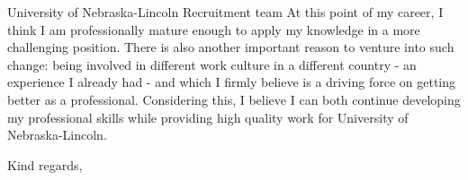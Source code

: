 \documentclass[11pt]{letter}
\begin{document}
\begin{letter}{University of Nebraska-Lincoln Recruitment team}
  At this point of my career, I think I am professionally mature enough to apply my knowledge in a more
  challenging position. There is also another important reason to venture into such change: being involved in different
  work culture in a different country - an experience I already had - and which I firmly believe is a driving force
  on getting better as a professional.
  Considering this, I believe I can both continue developing my professional skills while providing high quality work
  for University of Nebraska-Lincoln.
  
  \closing{Kind regards,}

  
\end{letter}
\end{document}
